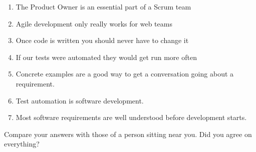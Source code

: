 \begin{enumerate}
\item The Product Owner is an essential part of a Scrum team
\item Agile development only really works for web teams
\item Once code is written you should never have to change it
\item If our tests were automated they would get run more often
\item Concrete examples are a good way to get a conversation going about a requirement.
\item Test automation is software development.
\item Most software requirements are well understood before development starts.
\end{enumerate}

Compare your answers with those of a person sitting near you. Did you agree on everything?